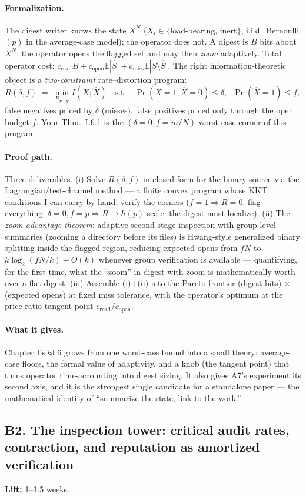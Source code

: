 \documentclass[11pt,a4paper]{article}
\newcommand{\lift}[1]{\noindent\textbf{Lift:} #1.}
\newcommand{\gives}{\paragraph{What it gives.}}
\newcommand{\form}{\paragraph{Formalization.}}
\newcommand{\proofpath}{\paragraph{Proof path.}}
\begin{document}
\form The digest writer knows the state $X^N$ ($X_i \in \{$load-bearing, inert$\}$, i.i.d.\ Bernoulli$(p)$ in the average-case model); the operator does not. A digest is $B$ bits about $X^N$; the operator opens the flagged set and may then \emph{zoom} adaptively. Total operator cost: $c_{\mathrm{read}}B + c_{\mathrm{open}}\mathbb{E}|\hat S| + c_{\mathrm{miss}}\mathbb{E}|S\setminus\hat S|$. The right information-theoretic object is a \emph{two-constraint} rate--distortion program:
\[ R(\delta, f) \;=\; \min_{P_{\hat X\mid X}} I(X;\hat X) \quad \text{s.t.}\quad \Pr(X{=}1, \hat X{=}0) \le \delta,\;\; \Pr(\hat X{=}1) \le f, \]
false negatives priced by $\delta$ (misses), false positives priced only through the open budget $f$. Your Thm.~I.6.1 is the $(\delta{=}0, f{=}m/N)$ worst-case corner of this program.

\proofpath Three deliverables. (i) Solve $R(\delta,f)$ in closed form for the binary source via the Lagrangian/test-channel method --- a finite convex program whose KKT conditions I can carry by hand; verify the corners ($f{=}1 \Rightarrow R{=}0$: flag everything; $\delta{=}0, f{=}p \Rightarrow R \to h(p)$-scale: the digest must localize). (ii) The \emph{zoom advantage theorem}: adaptive second-stage inspection with group-level summaries (zooming a directory before its files) is Hwang-style generalized binary splitting inside the flagged region, reducing expected opens from $fN$ to $k\log_2(fN/k) + O(k)$ whenever group verification is available --- quantifying, for the first time, what the ``zoom'' in digest-with-zoom is mathematically worth over a flat digest. (iii) Assemble (i)+(ii) into the Pareto frontier (digest bits) $\times$ (expected opens) at fixed miss tolerance, with the operator's optimum at the price-ratio tangent point $c_{\mathrm{read}}/c_{\mathrm{open}}$.

\gives Chapter I's \S I.6 grows from one worst-case bound into a small theory: average-case floors, the formal value of adaptivity, and a knob (the tangent point) that turns operator time-accounting into digest sizing. It also gives A7's experiment its second axis, and it is the strongest single candidate for a standalone paper --- the mathematical identity of ``summarize the state, link to the work.''

\subsection{B2. The inspection tower: critical audit rates, contraction, and reputation as amortized verification}
\lift{1--1.5 weeks}
\end{document}

